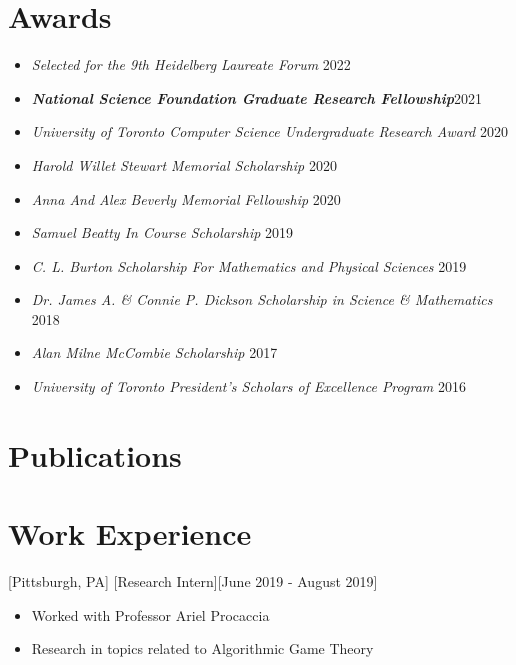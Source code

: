 \documentclass{article}
\begin{document}
    \section{Awards}
    \begin{itemize}
     \setlength\itemsep{.8ex}
     	\item \textsl{Selected for the 9th Heidelberg Laureate Forum} \hfill 2022
    	\item \textbf{\textsl{National Science Foundation Graduate Research Fellowship}}\hfill 2021
        \item \textsl{University of Toronto Computer Science Undergraduate Research Award} \hfill 2020
        \item \textsl{Harold Willet Stewart Memorial Scholarship} \hfill 2020
        \item \textsl{Anna And Alex Beverly Memorial Fellowship} \hfill 2020
        \item \textsl{Samuel Beatty In Course Scholarship} \hfill 2019
        \item \textsl{C. L. Burton Scholarship For Mathematics and Physical Sciences} \hfill 2019
        \item \textsl{Dr. James A. \& Connie P. Dickson Scholarship in Science \& Mathematics} \hfill 2018
        \item \textsl{Alan Milne McCombie Scholarship} \hfill 2017
        \item \textsl{University of Toronto President's Scholars of Excellence Program} \hfill 2016
    \end{itemize}


    \section{Publications}
    \begin{etaremune}
    	[itemsep=-.5ex,
    	leftmargin=3.5ex]
        
    \end{etaremune}
    
    \section{Work Experience}
    [Pittsburgh, PA]
    [Research Intern][June 2019 - August 2019]
    \begin{itemize}[noitemsep,nolistsep]
        \item Worked with Professor Ariel Procaccia
        \item Research in topics related to Algorithmic Game Theory
    \end{itemize}
\end{document}
